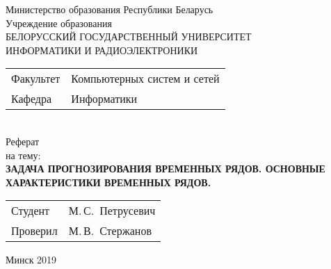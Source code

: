 \begin{titlepage}
  \begin{center}
    Министерство образования Республики Беларусь\\[1em]
    Учреждение образования\\
    БЕЛОРУССКИЙ ГОСУДАРСТВЕННЫЙ УНИВЕРСИТЕТ \\
    ИНФОРМАТИКИ И РАДИОЭЛЕКТРОНИКИ\\[1em]

    \begin{minipage}{\textwidth}
      \begin{flushleft}
        \begin{tabular}{ l l }
          Факультет & Компьютерных систем и сетей\\
          Кафедра   & Информатики
        \end{tabular}
      \end{flushleft}
    \end{minipage}\\[1em]


    {Реферат}\\
    {на тему:}\\[1em]
    \textbf{\large \MakeUppercase{Задача прогнозирования временных рядов. Основные характеристики временных рядов.}}\\[1em]


    \vfill
    \begin{tabular}{ p{}p{} }
      Студент & М.\,С.~Петрусевич \\
      Проверил & М.\,В.~Стержанов \\
    \end{tabular}
    
    \vfill
    {\normalsize Минск 2019}
  \end{center}
\end{titlepage}
